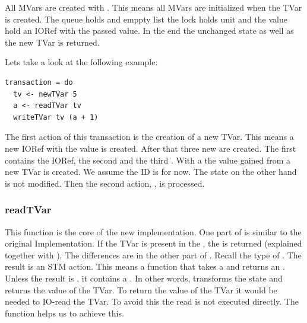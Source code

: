 All MVars are created with . This means all MVars are initialized when the TVar is created.
The queue holds and emppty list the lock holds unit and the value hold an IORef with the passed value.
In the end the unchanged state as well as the new TVar is returned.

Lets take a look at the following example:
\begin{lstlisting}
transaction = do 
  tv <- newTVar 5
  a <- readTVar tv
  writeTVar tv (a + 1)
\end{lstlisting}
The first action of this transaction is the creation of a new TVar. This means a new IORef with 
the value  is created. After that three new  are created. The first contains the 
IORef, the second \code{[]} and the third \code{()}. With a the value gained from 
 a new TVar is created. We assume the ID is  for now. 
The state on the other hand is not modified. Then the 
second action, , is processed.


\subsubsection{readTVar}
This function is the core of the new implementation. One part of  is similar to the original 
Implementation. If the TVar is present in the , the  is returned (explained together with ).
The differences are in the other part of . Recall the type of .
The result is an STM action. This means a function that takes a  and returns an . 
Unless the result is , it contains a . In other words,  transforms
the state and returns the value of the TVar. To return the value of the TVar it would be needed to IO-read the
TVar. To avoid this the read is not executed directly. The function  helps us to achieve this.

